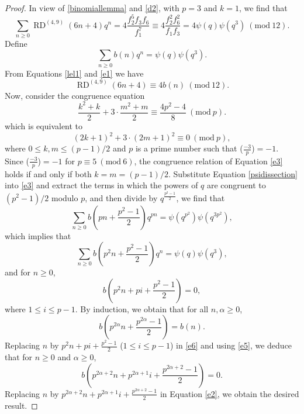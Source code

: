 \documentclass[12pt]{amsart}
\DeclareMathOperator {\myRD}{RD}
\theoremstyle{plain}
\theoremstyle{definition}
\begin{document}
\begin{proof} 
In view of \eqref{binomiallemma} and \eqref{d2}, with $p=3$ and $k=1$, we find that
\begin{equation}
\sum_{n\geq 0} \myRD^{(4, 9)}(6n+4)q^{n}=4\dfrac{f_{2}^{5}f_{3}f_{6}}{f_{1}^{7}} \equiv 4 \dfrac{f_{2}^{2} f_{6}^{2}}{f_{1} f_{3}} = 4\psi(q) \psi(q^{3}) \ (\mathrm{mod} \ 12). \label{lel1}
\end{equation}
Define
\begin{equation} 
\sum_{n\geq 0} b(n)q^{n} = \psi(q) \psi(q^{3}). \label{e1}
\end{equation}
From  Equations \eqref{lel1} and \eqref{e1} we have 
\begin{equation}
\myRD^{(4, 9)}(6n+4) \equiv 4b(n) \ (\mathrm{mod} \ 12).  \label{e2}
\end{equation} 
Now, consider the congruence equation
\[
\frac{k^{2}+k}{2}+3\cdot \frac{m^{2}+m}{2} \equiv  \frac{4p^{2}-4}{8} \ (\mathrm{mod} \ p).
\]
which is equivalent to
\begin{equation}
(2k+1)^{2}+ 3\cdot (2m+1)^{2}  \equiv  0 \ (\mathrm{mod} \ p), \label{e3}
\end{equation}
where $0 \leq k,m \leq (p-1)/2$ and $p$ is a prime number such that ($\frac{-3}{p}$)$=-1$. Since ($\frac{-3}{p}$)$=-1$ for $p \equiv 5 \ (\mathrm{mod} \ 6)$, the congruence relation of Equation \eqref{e3} holds if and only if both $k=m=(p-1)/2$. Substitute Equation \eqref{psidissection} into \eqref{e3} and extract the terms in which the powers of $q$ are congruent to $(p^{2}-1)/2$ modulo $p$, and then divide by $q^{\frac{p^{2}-1}{2}}$, we find that
\[
\sum_{n\geq 0} b \left(pn+\frac{p^{2}-1}{2} \right) q^{pn} = \psi(q^{p^{2}}) \psi(q^{3p^{2}}),
\]
which implies that 
\[
\sum_{n\geq 0} b\left( p^{2}n+\frac{p^{2}-1}{2} \right)q^{n} = \psi(q) \psi(q^{3}),
\]
and for $n\geq 0$,
\begin{equation}
b \left(p^{2}n+pi+\frac{p^{2}-1}{2}\right) = 0, \label{e5}
\end{equation}
where  $1\leq i \leq p-1$. By induction, we obtain  that for all $n, \alpha \geq 0$,
\begin{equation}
b\left( p^{2\alpha}n+\frac{p^{2\alpha}-1}{2} \right)=b(n). \label{e6}
\end{equation}
Replacing $n$ by $p^{2}n+pi+\frac{p^{2}-1}{2}$ ($1\leq i \leq p-1$) in \eqref{e6} and using \eqref{e5}, we deduce that for $n\geq 0$ and $\alpha \geq 0$,
\[
b\left( p^{2\alpha+2}n+p^{2\alpha+1}i+\frac{p^{2\alpha+2}-1}{2} \right)=0.
\]
Replacing $n$ by $p^{2\alpha+2}n+p^{2\alpha+1}i+\frac{p^{2\alpha+2}-1}{2}$ in Equation \eqref{e2}, we obtain the desired result.
\end{proof}
\end{document}
